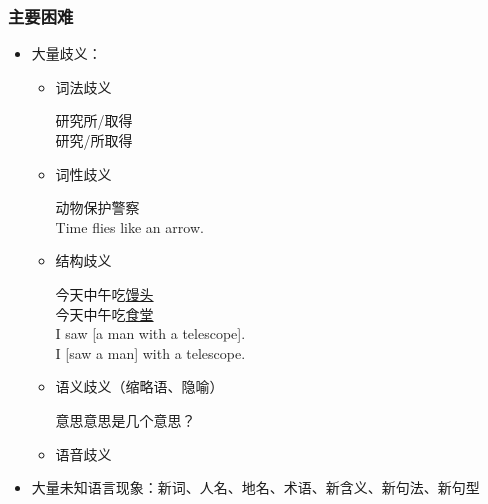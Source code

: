 \subsubsection{主要困难}
\begin{itemize}
	\item 大量歧义：
	\begin{itemize}
		\item 词法歧义
		\begin{displayquote}
		研究所/取得\\
		研究/所取得
		\end{displayquote}
		\item 词性歧义
		\begin{displayquote}
		动物保护警察\\
		Time flies like an arrow.
		\end{displayquote}
		\item 结构歧义
		\begin{displayquote}
		今天中午吃\underline{馒头}\\
		今天中午吃\underline{食堂}\\
		I saw [a man with a telescope].\\
		I [saw a man] with a telescope.
		\end{displayquote}
		\item 语义歧义（缩略语、隐喻）
		\begin{displayquote}
		意思意思是几个意思？
		\end{displayquote}
		\item 语音歧义
	\end{itemize}
	\item 大量未知语言现象：新词、人名、地名、术语、新含义、新句法、新句型
\end{itemize}

